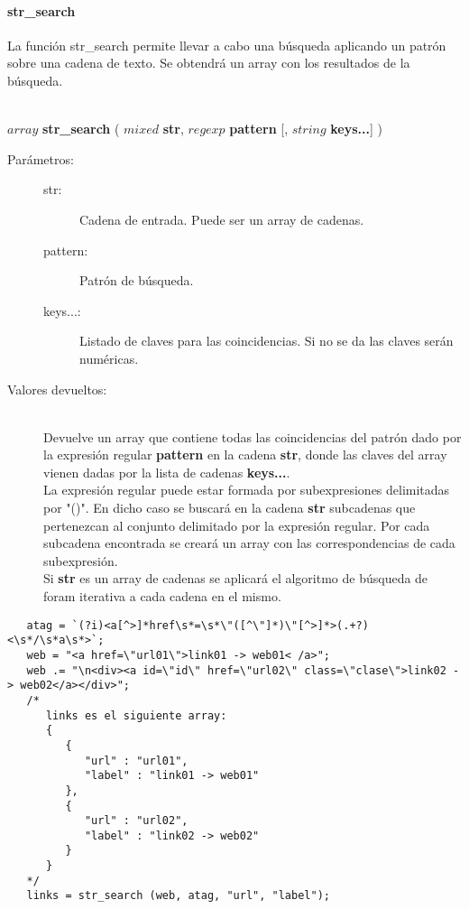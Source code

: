\paragraph{str\_search}
La función str\_search permite llevar a cabo una búsqueda aplicando un patrón sobre una 
cadena de texto. Se obtendrá un array con los resultados de la búsqueda.

\begin{framed}
\hfill \\ $array$ \textbf{str\_search} ( $mixed$ \textbf{str}, $regexp$ \textbf{pattern} [, $string$ \textbf{keys...}] )  
\begin{description}
\item [Parámetros:] \hfill 
   \begin{description}
   \item[str:] Cadena de entrada. Puede ser un array de cadenas.
   \item[pattern:] Patrón de búsqueda. 
   \item[keys...:] Listado de claves para las coincidencias. Si no se da las
   claves serán numéricas.
   \end{description}
\item[Valores devueltos:] \hfill \\
   Devuelve un array que contiene todas las coincidencias del patrón dado por la 
   expresión regular \textbf{pattern} en la cadena \textbf{str}, donde las 
   claves del array vienen dadas por la lista de cadenas \textbf{keys...}. \\
   
   La expresión regular puede estar formada por subexpresiones delimitadas
   por "()". En dicho caso se buscará en la cadena \textbf{str} subcadenas que pertenezcan al
   conjunto delimitado por la expresión regular. Por cada subcadena encontrada se creará un array
   con las correspondencias de cada subexpresión. \\
   
   Si \textbf{str} es un array de cadenas se aplicará el algoritmo de búsqueda de foram iterativa a cada cadena en el mismo.
\end{description}
\end{framed}

\begin{lstlisting}   
   atag = `(?i)<a[^>]*href\s*=\s*\"([^\"]*)\"[^>]*>(.+?)<\s*/\s*a\s*>`;
   web = "<a href=\"url01\">link01 -> web01< /a>";
   web .= "\n<div><a id=\"id\" href=\"url02\" class=\"clase\">link02 -> web02</a></div>";
   /*
      links es el siguiente array:
      {
         {
            "url" : "url01",
            "label" : "link01 -> web01"
         },
         {
            "url" : "url02",
            "label" : "link02 -> web02"
         }
      }
   */
   links = str_search (web, atag, "url", "label");
\end{lstlisting}

